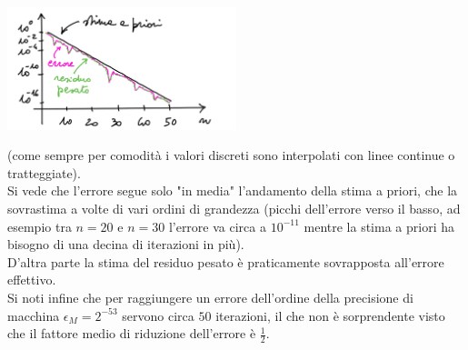 \documentclass[12pt]{article}
\begin{document}
\begin{center}
    \includegraphics[width=0.5\textwidth]{grafo2.png}\par
\end{center}
(come sempre per comodità i valori discreti sono interpolati con linee continue o tratteggiate).\\
Si vede che l'errore segue solo "in media" l'andamento della stima a priori, che la sovrastima a volte di vari ordini di grandezza (picchi dell'errore verso il basso, ad esempio tra $n=20$ e $n=30$ l'errore va circa a $10^{-11}$ mentre la stima a priori ha bisogno di una decina di iterazioni in più).\\
D'altra parte la stima del residuo pesato è praticamente sovrapposta all'errore effettivo.\\
Si noti infine che per raggiungere un errore dell'ordine della precisione di macchina $\epsilon_M=2^{-53}$ servono circa $50$ iterazioni, il che non è sorprendente visto che il fattore medio di riduzione dell'errore è $\frac{1}{2}$.
\end{document}
